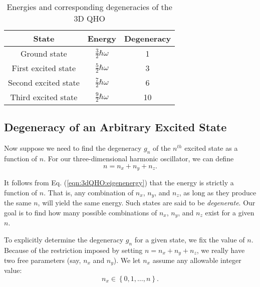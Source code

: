 \documentclass{article}
\numberwithin{equation}{section}
\begin{document}
\begin{table}[H]
\centering
{}
\caption{Energies and corresponding degeneracies of the 3D QHO}
\begin{tabular}{@{}ccc@{}}
\toprule
State & Energy & Degeneracy \\ \midrule
\multicolumn{1}{c|}{Ground state} & \multicolumn{1}{c|}{$\displaystyle \frac{3}{2}\hbar\omega$} & 1 \\[1em]
\multicolumn{1}{c|}{First excited state} & \multicolumn{1}{c|}{$\displaystyle \frac{5}{2}\hbar\omega$} & 3 \\[1em]
\multicolumn{1}{c|}{Second excited state} & \multicolumn{1}{c|}{$\displaystyle \frac{7}{2}\hbar\omega$} & 6 \\[1em]
\multicolumn{1}{c|}{Third excited state} & \multicolumn{1}{c|}{$\displaystyle \frac{9}{2}\hbar\omega$} & 10 \\ \bottomrule
\end{tabular}
\end{table}

\subsection{Degeneracy of an Arbitrary Excited State}

Now suppose we need to find the degeneracy $g_n$ of the $n^{th}$ excited state as a function of $n$. For our three-dimensional harmonic oscillator, we can define
\begin{equation*}
    n = n_x + n_y + n_z.
\end{equation*}

It follows from Eq. (\ref{eqn:3dQHO:eigenenergy}) that the energy is strictly a function of $n$. That is, any combination of $n_x$, $n_y$, and $n_z$, as long as they produce the same $n$, will yield the same energy. Such states are said to be \emph{degenerate}. Our goal is to find how many possible combinations of $n_x$, $n_y$, and $n_z$ exist for a given $n$.

To explicitly determine the degeneracy $g_n$ for a given state, we fix the value of $n$. Because of the restriction imposed by setting $n = n_x + n_y + n_z$, we really have two free parameters (say, $n_x$ and $n_y$). We let $n_x$ assume any allowable integer value:
\begin{equation*}
    n_x \in \left\{ 0, 1, \dots, n \right\}.
\end{equation*}
\end{document}
